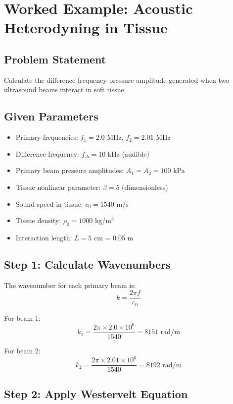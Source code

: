 \section{Worked Example: Acoustic Heterodyning in Tissue}

\subsection*{Problem Statement}

Calculate the difference frequency pressure amplitude generated when two ultrasound beams interact in soft tissue.

\subsection*{Given Parameters}
\begin{itemize}
\item Primary frequencies: $f_1 = 2.0$ MHz, $f_2 = 2.01$ MHz
\item Difference frequency: $f_{\Delta} = 10$ kHz (audible)
\item Primary beam pressure amplitudes: $A_1 = A_2 = 100$ kPa
\item Tissue nonlinear parameter: $\beta = 5$ (dimensionless)
\item Sound speed in tissue: $c_0 = 1540$ m/s
\item Tissue density: $\rho_0 = 1000$ kg/m$^3$
\item Interaction length: $L = 5$ cm = 0.05 m
\end{itemize}

\subsection*{Step 1: Calculate Wavenumbers}

The wavenumber for each primary beam is:
\begin{equation}
k = \frac{2\pi f}{c_0}
\end{equation}

For beam 1:
\begin{equation}
k_1 = \frac{2\pi \times 2.0 \times 10^6}{1540} = 8151 \text{ rad/m}
\end{equation}

For beam 2:
\begin{equation}
k_2 = \frac{2\pi \times 2.01 \times 10^6}{1540} = 8192 \text{ rad/m}
\end{equation}

\subsection*{Step 2: Apply Westervelt Equation}

